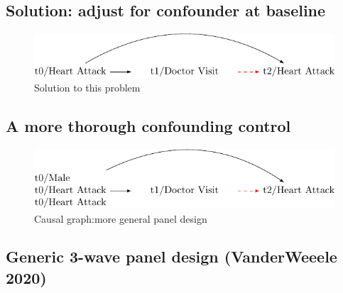 \documentclass[
  singlecolumn]{report}
\begin{document}
\hypertarget{solution-adjust-for-confounder-at-baseline}{%
\subsection{Solution: adjust for confounder at
baseline}\label{solution-adjust-for-confounder-at-baseline}}

\begin{figure}

{\centering \includegraphics[width=1\textwidth,height=\textheight]{causal-dags_files/figure-pdf/fig-dag-4-1.pdf}

}

\caption{\label{fig-dag-4}Solution to this problem}

\end{figure}

\hypertarget{a-more-thorough-confounding-control}{%
\subsection{A more thorough confounding
control}\label{a-more-thorough-confounding-control}}

\begin{figure}

{\centering \includegraphics[width=1\textwidth,height=\textheight]{causal-dags_files/figure-pdf/fig-dag-5-1.pdf}

}

\caption{\label{fig-dag-5}Causal graph:more general panel design}

\end{figure}

\hypertarget{generic-3-wave-panel-design-vanderweeele-2020}{%
\subsection{Generic 3-wave panel design (VanderWeeele
2020)}\label{generic-3-wave-panel-design-vanderweeele-2020}}
\end{document}
